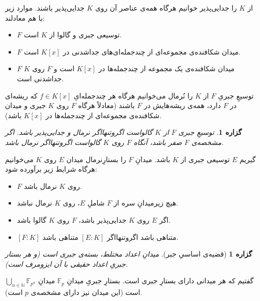 \documentclass[12pt,a4paper]{report}
\theoremstyle{colorhead}
\newtheorem{prop}[thm]{گزاره}
\begin{document}
از
$K$
را جدایی‌پذیر خوانیم هرگاه همه‌ی عناصر آن روی
$K$
جدایی‌پذیر باشند. موارد زیر با هم معادلند:
\begin{itemize}
\item 
$F$
توسیعی جبری و گالوا از
$K$
است.
\item 
$F$
میدان شکافنده‌ی مجموعه‌ای از چندجمله‌ای‌های جداشدنی در
$K[x]$
است.
\item 
$F$
میدان شکافنده‌ی یک مجموعه از چندجمله‌ها در
$K[x]$
است و 
$F$
روی
$K$
جداشدنی است.
\end{itemize}
توسیعِ جبریِ
$F$
از
$K$
را نُرمال می‌خوانیم هرگاه هر چندجمله‌ایِ
$f\in K[x]$
که ریشه‌ای در
$F$
دارد، همه‌ی ریشه‌هایش در
$F$
باشند (معادلاً هرگاه
$F$
روی
$K$
جبری و میدان شکافنده‌ی مجموعه‌ای از چندجمله‌ها در
$K[x]$
باشد).
\begin{prop}
توسیعِ جبری
$F$
از
$K$
گالواست اگروتنهااگر
نرمال  و جدایی‌پذیر باشد. اگر مشخصه‌ی
$F$
صفر باشد، آنگاه
$F$
روی
$K$
گالواست اگروتنهااگر نرمال باشد.
\end{prop}
گیریم
$E$
توسیعی جبری از
$K$
باشد. میدانِ
$F$
را بستارِنرمال
میدان
$E$
روی
$K$
می‌خوانیم هرگاه شرایط زیر برآورده شود:
\begin{itemize}
\item 
$F$
روی
$K$
نرمال باشد.
\item
هیچ زیرمیدانِ سره از
$F$
شاملِ
$E$، 
روی
$K$
نرمال نباشد.
\item
اگر
$E$
روی
$K$
جدایی‌پذیر باشد،
$F$
روی
$K$
گالوا باشد.
\item
$[F:K]$
متناهی باشد اگروتنهااگر
$[E:K]$
متناهی باشد.
\end{itemize}
\begin{prop}[قضیه‌ی اساسیِ  جبر]
\label{asasijabr}
میدانِ اعداد مختلط، بسته‌ی جبری است (و هر بستار جبریِ اعداد حقیقی با آن ایزومرف است).
\end{prop}
گفتیم که هر میدانی دارای بستارِ جبری است. بستارِ جبریِ‌
میدانِ
$\mathbb{F}_p$
میدانِ
$\bigcup_{n\in\mathbb{N}} \mathbb{F}_{p^n}$
است (این میدان نیز دارای مشخصه‌ی
$p$
است).
\end{document}
